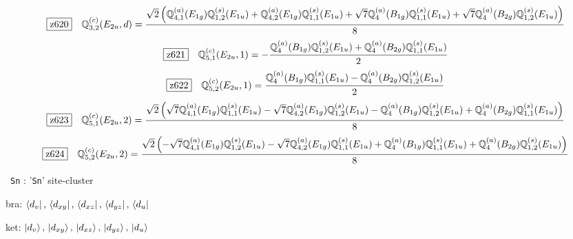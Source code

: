 \documentclass[fleqn,10pt,landscape]{jsarticle}
\begin{document}
\begin{dmath*}
\hspace*{3mm}\fbox{z620}\quad \mathbb{Q}_{3,2}^{(c)}(E_{2u},d)=\frac{\sqrt{2} \left(\mathbb{Q}_{4,1}^{(a)}(E_{1g}) \mathbb{Q}_{1,2}^{(s)}(E_{1u}) + \mathbb{Q}_{4,2}^{(a)}(E_{1g}) \mathbb{Q}_{1,1}^{(s)}(E_{1u}) + \sqrt{7} \mathbb{Q}_{4}^{(a)}(B_{1g}) \mathbb{Q}_{1,1}^{(s)}(E_{1u}) + \sqrt{7} \mathbb{Q}_{4}^{(a)}(B_{2g}) \mathbb{Q}_{1,2}^{(s)}(E_{1u})\right)}{8}
\end{dmath*}
\begin{dmath*}
\hspace*{3mm}\fbox{z621}\quad \mathbb{Q}_{5,1}^{(c)}(E_{2u},1)=- \frac{\mathbb{Q}_{4}^{(a)}(B_{1g}) \mathbb{Q}_{1,2}^{(s)}(E_{1u}) + \mathbb{Q}_{4}^{(a)}(B_{2g}) \mathbb{Q}_{1,1}^{(s)}(E_{1u})}{2}
\end{dmath*}
\begin{dmath*}
\hspace*{3mm}\fbox{z622}\quad \mathbb{Q}_{5,2}^{(c)}(E_{2u},1)=\frac{\mathbb{Q}_{4}^{(a)}(B_{1g}) \mathbb{Q}_{1,1}^{(s)}(E_{1u}) - \mathbb{Q}_{4}^{(a)}(B_{2g}) \mathbb{Q}_{1,2}^{(s)}(E_{1u})}{2}
\end{dmath*}
\begin{dmath*}
\hspace*{3mm}\fbox{z623}\quad \mathbb{Q}_{5,1}^{(c)}(E_{2u},2)=\frac{\sqrt{2} \left(\sqrt{7} \mathbb{Q}_{4,1}^{(a)}(E_{1g}) \mathbb{Q}_{1,1}^{(s)}(E_{1u}) - \sqrt{7} \mathbb{Q}_{4,2}^{(a)}(E_{1g}) \mathbb{Q}_{1,2}^{(s)}(E_{1u}) - \mathbb{Q}_{4}^{(a)}(B_{1g}) \mathbb{Q}_{1,2}^{(s)}(E_{1u}) + \mathbb{Q}_{4}^{(a)}(B_{2g}) \mathbb{Q}_{1,1}^{(s)}(E_{1u})\right)}{8}
\end{dmath*}
\begin{dmath*}
\hspace*{3mm}\fbox{z624}\quad \mathbb{Q}_{5,2}^{(c)}(E_{2u},2)=\frac{\sqrt{2} \left(- \sqrt{7} \mathbb{Q}_{4,1}^{(a)}(E_{1g}) \mathbb{Q}_{1,2}^{(s)}(E_{1u}) - \sqrt{7} \mathbb{Q}_{4,2}^{(a)}(E_{1g}) \mathbb{Q}_{1,1}^{(s)}(E_{1u}) + \mathbb{Q}_{4}^{(a)}(B_{1g}) \mathbb{Q}_{1,1}^{(s)}(E_{1u}) + \mathbb{Q}_{4}^{(a)}(B_{2g}) \mathbb{Q}_{1,2}^{(s)}(E_{1u})\right)}{8}
\end{dmath*}
\vspace{5mm}

\noindent\textbullet\, \texttt{Sn} : '\texttt{Sn}' site-cluster

\noindent\quad * bra: $\bra{d_{v}},\, \bra{d_{xy}},\, \bra{d_{xz}},\, \bra{d_{yz}},\, \bra{d_{u}}$

\noindent\quad * ket: $\ket{d_{v}},\, \ket{d_{xy}},\, \ket{d_{xz}},\, \ket{d_{yz}},\, \ket{d_{u}}$
\end{document}
